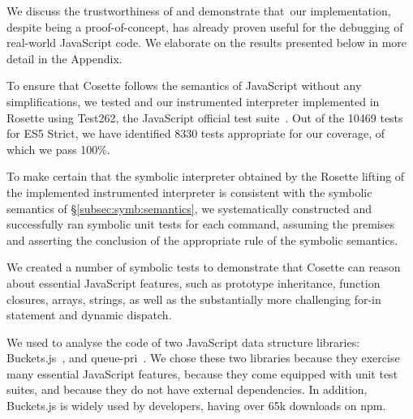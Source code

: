 
We discuss the trustworthiness of \cosette and demonstrate that~our implementation, despite being  a proof-of-concept, has already proven useful for the debugging of real-world JavaScript code.
We elaborate on the results presented below in more detail in the Appendix. 



To ensure that Cosette follows the semantics of JavaScript without any simplifications, we tested \JSComp and our instrumented \jsil interpreter implemented in Rosette using Test262, the JavaScript official test suite~\cite{test262}. 
Out of the 10469 tests for ES5 Strict, we have identified 8330 tests appropriate for our coverage, of which we pass 100\%.

 To make certain that the symbolic \jsil interpreter obtained by the Rosette lifting of the implemented instrumented interpreter is consistent with the symbolic semantics of \S\ref{subsec:symb:semantics}, we systematically constructed and successfully ran symbolic unit tests for each \jsil command, assuming the premises and asserting the conclusion of the appropriate rule of the symbolic semantics.


We created a number of symbolic tests to demonstrate that Cosette can reason about essential JavaScript features, such as prototype inheritance, function closures, arrays, strings, as well as the substantially more challenging for-in statement and dynamic dispatch. 

We used \cosette to analyse the code of two JavaScript data structure libraries: Buckets.js~\cite{buckets}, and queue-pri~\cite{priq}.
We chose these two libraries because they exercise many essential JavaScript features, because they come equipped with unit test suites, and because they do not have external dependencies. In addition, Buckets.js is widely used by developers, having over 65k downloads on npm.

